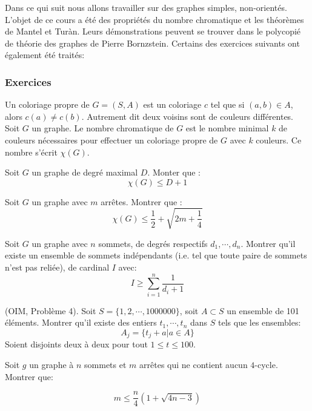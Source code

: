 

Dans ce qui suit nous allons travailler sur des graphes simples, non-orientés. L'objet de ce cours a été des propriétés du nombre chromatique et les théorèmes de Mantel et Tur\`an. Leurs démonstrations peuvent se trouver dans le polycopié de théorie des graphes de Pierre Bornzstein. Certains des exercices suivants ont également été traités:

\subsubsection{Exercices}

\begin{defn}

Un coloriage propre de $G=(S,A)$ est un coloriage $c$ tel que si $(a,b)\in A$, alors $c(a)\neq c(b)$. Autrement dit deux voisins sont de couleurs différentes.\\

Soit $G$ un graphe. Le nombre chromatique de $G$ est le nombre minimal $k$ de couleurs nécessaires pour effectuer un coloriage propre de $G$ avec $k$ couleurs. 
 Ce nombre s'écrit $\chi(G)$.
\end{defn}
\begin{exo}
Soit $G$ un graphe de degré maximal $D$. Monter que :
$$\chi(G)\leq D+1$$
\end{exo}

\begin{exo}
Soit $G$ un graphe avec $m$ arrêtes. Montrer que :
$$\chi(G)\leq \frac{1}{2}+\sqrt{2m+\frac{1}{4}}$$
\end{exo}

\begin{exo}
Soit $G$ un graphe avec $n$ sommets, de degrés respectifs $d_1,\cdots,d_n$. Montrer qu'il existe un ensemble de sommets indépendants (i.e. tel que toute paire de sommets n'est pas reliée), de cardinal $I$ avec:
 $$I\geq\sum_{i=1}^n \frac{1}{d_i+1}$$
\end{exo}

\begin{exo}(OIM, Problème 4).
Soit $S=\{1,2,\cdots,1000000\}$, soit $A\subset S$ un ensemble de 101 éléments.
Montrer qu'il existe des entiers $t_1,\cdots,t_n$ dans $S$ tels que les ensembles: 
$$A_j=\{t_j+a|a\in A\}$$ 
Soient disjoints deux à deux pour tout $1\leq t\leq 100$.
\end{exo}

\begin{exo}
Soit $g$ un graphe à $n$ sommets et $m$ arrêtes qui ne contient aucun $4$-cycle. Montrer que:

$$m\leq \frac{n}{4}(1+\sqrt{4n-3})$$
\end{exo}

